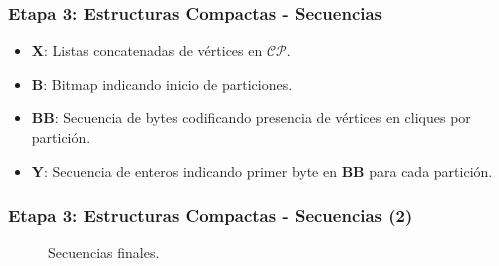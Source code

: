 \begin{frame}
\frametitle{Etapa 3: Estructuras Compactas - Secuencias}

\begin{itemize}
	\item \textbf{X}: Listas concatenadas de vértices en $\mathcal{C}\mathcal{P}$.
	\item \textbf{B}: Bitmap indicando inicio de particiones.
	\item \textbf{BB}: Secuencia de bytes codificando presencia de vértices en cliques por partición.
	\item \textbf{Y}: Secuencia de enteros indicando primer byte en \textbf{BB} para cada partición.
\end{itemize}

\end{frame}


\begin{frame}
\frametitle{Etapa 3: Estructuras Compactas - Secuencias (2)}

\begin{figure}
    	\centering
    	
    	\begin{minipage}{\textwidth}
    		\footnotesize
    		\centering
    		
    	\end{minipage}
    	
    	\vspace{2mm}
    	\begin{minipage}{\textwidth}
    		\footnotesize
    		\centering
    		
    	\end{minipage}
    	
    	\vspace{2mm}
    \begin{minipage}{\textwidth}
    		\footnotesize
    		\centering
    		
    \end{minipage}
    
    	\caption{Secuencias finales.}
    \label{fig:sequences}
\end{figure}

\end{frame}



